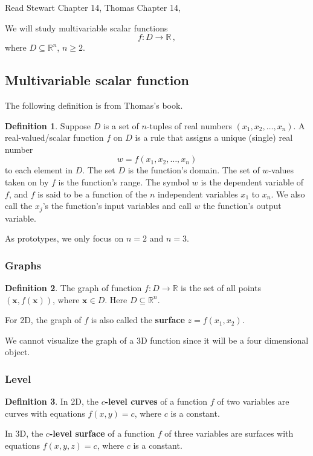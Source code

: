 \documentclass[
]{article}
\theoremstyle{definition}
\newtheorem{definition}{Definition}[section]
\theoremstyle{definition}
\theoremstyle{definition}
\theoremstyle{definition}
\theoremstyle{remark}
\begin{document}
Read Stewart Chapter 14, Thomas Chapter 14,

We will study multivariable scalar functions
\[ f: D \to \mathbb{R}\,,\]
where \(D\subseteq \mathbb{R}^n\), \(n\geq 2\).

\subsection{Multivariable scalar function}\label{multivariable-scalar-function}

The following definition is from Thomas's book.

\begin{definition}
Suppose \(D\) is a set of \(n\)-tuples of real numbers \((x_1, x_2, \ldots, x_n)\).
A real-valued/scalar function \(f\) on \(D\) is a rule that assigns a unique (single) real
number
\[w = f(x_1, x_2, \ldots, x_n)\]
to each element in \(D\).
The set \(D\) is the function's domain. The set of \(w\)-values taken on by \(f\) is
the function's range. The symbol \(w\) is the dependent variable of \(f\), and \(f\)
is said to be a function of the \(n\) independent variables \(x_1\) to \(x_n\).
We also call the \(x_j\)'s the function's input variables and call \(w\) the function's output variable.
\end{definition}

As prototypes, we only focus on \(n=2\) and \(n=3\).

\subsubsection{Graphs}\label{graphs}

\begin{definition}
The graph of function \(f:D \to \mathbb{R}\) is the set of all points
\((\mathbf{x}, f(\mathbf{x}))\), where \(\mathbf{x}\in D\).
Here \(D\subseteq \mathbb{R}^n\).
\end{definition}

For 2D, the graph of \(f\) is also called the \textbf{surface} \(z = f(x_1,x_2)\).

We cannot visualize the graph of a 3D function since it will be a four dimensional object.

\subsubsection{Level}\label{level}

\begin{definition}
In 2D, the \textbf{\(c\)-level curves} of a function \(f\) of two variables are curves with equations
\(f(x,y) = c\), where \(c\) is a constant.

In 3D, the \textbf{\(c\)-level surface} of a function \(f\) of three variables are surfaces
with equations \(f(x,y,z) = c\), where \(c\) is a constant.
\end{definition}
\end{document}
